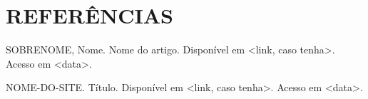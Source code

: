 \documentclass[12pt,a4paper]{article}
\begin{document}
\clearpage %
\section*{REFERÊNCIAS}
	\singlespace
	SOBRENOME, Nome. Nome do artigo. Disponível em <link, caso tenha>. Acesso em <data>.
	
	NOME-DO-SITE. Título. Disponível em <link, caso tenha>. Acesso em <data>.
\end{document}
